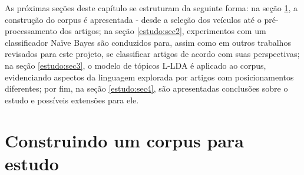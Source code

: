 As próximas seções deste capítulo se estruturam da seguinte forma: na seção \ref{estudo:sec1}, a construção do corpus é apresentada - desde a seleção dos veículos até o pré-processamento dos artigos; na seção \ref{estudo:sec2}, experimentos com um classificador Naïve Bayes são conduzidos para, assim como em outros trabalhos revisados para este projeto, se classificar artigos de acordo com suas perspectivas; na seção \ref{estudo:sec3}, o modelo de tópicos L-LDA é aplicado ao corpus, evidenciando aspectos da linguagem explorada por artigos com posicionamentos diferentes; por fim, na seção \ref{estudo:sec4}, são apresentadas conclusões sobre o estudo e possíveis extensões para ele. %








\section{Construindo um corpus para estudo}
\label{estudo:sec1}


